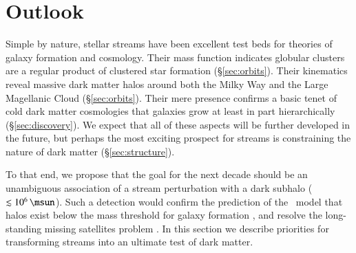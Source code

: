 \documentclass[final,5p,times,twocolumn,authoryear]{elsarticle}
\begin{document}
\section{Outlook}
\label{sec:outlook}

Simple by nature, stellar streams have been excellent test beds for theories of galaxy formation and cosmology.
Their mass function indicates globular clusters are a regular product of clustered star formation (\S\ref{sec:orbits}).
Their kinematics reveal massive dark matter halos around both the Milky Way and the Large Magellanic Cloud (\S\ref{sec:orbits}).
Their mere presence confirms a basic tenet of cold dark matter cosmologies that galaxies grow at least in part hierarchically (\S\ref{sec:discovery}).
We expect that all of these aspects will be further developed in the future, but perhaps the most exciting prospect for streams is constraining the nature of dark matter (\S\ref{sec:structure}).

To that end, we propose that the goal for the next decade should be an unambiguous association of a stream perturbation with a dark subhalo ($\lesssim10^6\,\unit{\msun}$).
Such a detection would confirm the prediction of the \lcdm\ model that halos exist below the mass threshold for galaxy formation \citep{bullock:2000, benson:2002, somerville:2002, benitez-llambay:2020}, and resolve the long-standing missing satellites problem \citep{klypin:1999}.
In this section we describe priorities for transforming streams into an ultimate test of dark matter.
\end{document}
